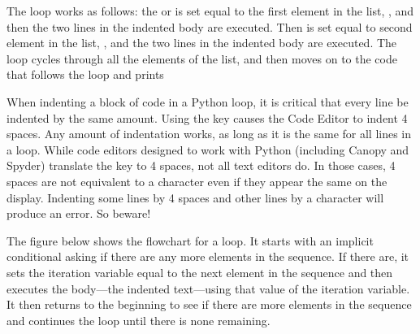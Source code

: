 \documentclass[letterpaper,10pt,english]{sphinxmanual}
\begin{document}
\begin{sphinxVerbatim}[commandchars=\\\{\},numbers=left,firstnumber=1,stepnumber=1]
 
\end{sphinxVerbatim}

\sphinxAtStartPar
The  loop works as follows: the  or   is set equal to the first element in the list, , and then the two lines in the indented body are executed.  Then  is set equal to second element in the list, , and the two lines in the indented body are executed.  The loop cycles through all the elements of the list, and then moves on to the code that follows the  loop and prints 

\sphinxAtStartPar
When indenting a block of code in a Python  loop, it is critical that every line be indented by the same amount.  Using the  key causes the Code Editor to indent 4 spaces.  Any amount of indentation works, as long as it is the same for all lines in a  loop.  While code editors designed to work with Python (including Canopy and Spyder) translate the  key to 4 spaces, not all text editors do.  In those cases, 4 spaces are not equivalent to a  character even if they appear the same on the display.  Indenting some lines by 4 spaces and other lines by a  character will produce an error.  So beware!

\sphinxAtStartPar
The figure below shows the flowchart for a  loop.  It starts with an implicit conditional asking if there are any more elements in the sequence.  If there are, it sets the iteration variable equal to the next element in the sequence and then executes the body—the indented text—using that value of the iteration variable.  It then  returns to the beginning to see if there are more elements in the sequence and continues the loop until there is none remaining.
\end{document}
